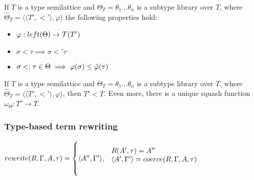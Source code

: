 \documentclass[main.tex]{subfiles}
\begin{document}
\begin{prop}
    If $T$ is a type semilattice and
    $\Theta_T = \theta_1 ... \theta_n$ is a subtype library over $T$, where
    $\hat{\Theta}_T = \langle \langle T', \less' \rangle, \varphi \rangle$
    the following properties hold:
    \begin{itemize}
        \item $\varphi : left(\Theta) \rightarrow \mathcal{T}( T' )$
        \item $\sigma \less \tau \implies \sigma \less' \tau$
        \item $\sigma <: \tau \in \Theta \implies \varphi(\sigma) \leq \hat{\varphi}(\tau)$
    \end{itemize}
\end{prop}

\begin{prop}
    If $T$ is a type semilattice and
    $\Theta_T = \theta_1 ... \theta_n$ is a subtype library over $T$, where
    $\hat{\Theta}_T = \langle \langle T', \less' \rangle, \varphi \rangle$,
    then $T' \less T$. Even more, there is a unique squash function
    $\omega_{\Theta} : T' \rightarrow T$.
\end{prop}

\subsubsection{Type-based term rewriting}

\[
rewrite(R, \Gamma, A, \tau) =
\begin{cases*}
    \langle A'', \Gamma' \rangle,
    & \parbox{.6\textwidth}{\vspace{1em}
        $R(A', \tau) = A''$ \\
        $\langle A', \Gamma' \rangle = coerce(R, \Gamma, A, \tau)$ \\
        \vspace{1em}} \\
\end{cases*}
\]
\end{document}
